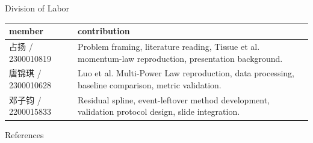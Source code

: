 \documentclass[fontset=fandol,aspectratio=169,10pt]{ctexbeamer}
\newcommand{\MemberA}{占扬 / 2300010819}
\newcommand{\MemberB}{唐锦琪 / 2300010628}
\newcommand{\MemberC}{邓子钧 / 2200015833}
\begin{document}
\begin{frame}{Division of Labor}
  \begin{table}
    \centering
    \scriptsize
    \begin{tabularx}{0.96\textwidth}{lX}
      \toprule
      member & contribution\\
      \midrule
      \MemberA & Problem framing, literature reading, Tissue et al. momentum-law reproduction, presentation background.\\
      \MemberB & Luo et al. Multi-Power Law reproduction, data processing, baseline comparison, metric validation.\\
      \MemberC & Residual spline, event-leftover method development, validation protocol design, slide integration.\\
      \bottomrule
    \end{tabularx}
  \end{table}
\end{frame}

\begin{frame}[allowframebreaks]{References}
  \tiny
  
  
\end{frame}
\end{document}
